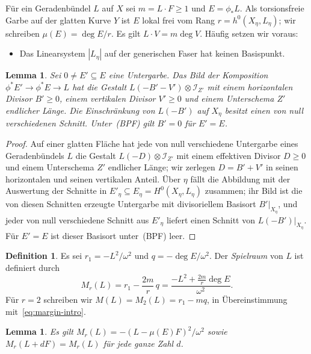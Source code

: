 \documentclass[11pt]{article}
\newtheorem{lemma}[theorem]{Lemma}
\theoremstyle{definition}
\newtheorem{definition}[theorem]{Definition}
\theoremstyle{remark}
\newcommand{\cI}{\mathcal{I}}
\newcommand{\bpf}{\textup{(BPF)}}
\begin{document}
Für ein Geradenbündel $L$ auf $X$ sei $m=L\cdot F\ge 1$ und $E=\phi_*L$. Als
torsionsfreie Garbe auf der glatten Kurve $Y$ ist $E$ lokal frei vom Rang
$r=h^0(X_\eta,L_\eta)$; wir schreiben $\mu(E)=\deg E/r$. Es gilt $L\cdot V=m\deg
V$. Häufig setzen wir voraus:
\begin{itemize}[leftmargin=3.5em]
\item[\bpf] Das Linearsystem $|L_\eta|$ auf der generischen Faser hat keinen
Basispunkt.
\end{itemize}

\begin{lemma}\label{lem:image}
Sei $0\ne E'\subseteq E$ eine Untergarbe. Das Bild der Komposition
$\phi^*E'\to\phi^*E\to L$ hat die Gestalt $L(-B'-V')\otimes\cI_{Z'}$ mit einem
horizontalen Divisor $B'\ge 0$, einem vertikalen Divisor $V'\ge 0$ und einem
Unterschema $Z'$ endlicher Länge. Die Einschränkung von $L(-B')$ auf $X_\eta$
besitzt einen von null verschiedenen Schnitt. Unter~\bpf{} gilt $B'=0$ für
$E'=E$.
\end{lemma}

\begin{proof}
Auf einer glatten Fläche hat jede von null verschiedene Untergarbe eines
Geradenbündels $L$ die Gestalt $L(-D)\otimes\cI_{Z'}$ mit einem effektiven
Divisor $D\ge 0$ und einem Unterschema $Z'$ endlicher Länge; wir zerlegen
$D=B'+V'$ in seinen horizontalen und seinen vertikalen Anteil. Über $\eta$ fällt
die Abbildung mit der Auswertung der Schnitte in
$E'_\eta\subseteq E_\eta=H^0(X_\eta,L_\eta)$ zusammen; ihr Bild ist die von diesen
Schnitten erzeugte Untergarbe mit divisoriellem Basisort $B'|_{X_\eta}$, und jeder
von null verschiedene Schnitt aus $E'_\eta$ liefert einen Schnitt von
$L(-B')|_{X_\eta}$. Für $E'=E$ ist dieser Basisort unter~\bpf{} leer.
\end{proof}

\begin{definition}\label{def:margin}
Es sei $r_1=-L^2/\omega^2$ und $q=-\deg E/\omega^2$. Der \emph{Spielraum} von
$L$ ist definiert durch
\[
M_r(L)=r_1-\frac{2m}{r}\,q=\frac{-L^2+\frac{2m}{r}\deg E}{\omega^2}.
\]
Für $r=2$ schreiben wir $M(L)=M_2(L)=r_1-mq$, in Übereinstimmung
mit~\eqref{eq:margin-intro}.
\end{definition}

\begin{lemma}\label{lem:square}
Es gilt $M_r(L)=-(L-\mu(E)F)^2/\omega^2$ sowie $M_r(L+dF)=M_r(L)$ für jede ganze
Zahl $d$.
\end{lemma}
\end{document}
